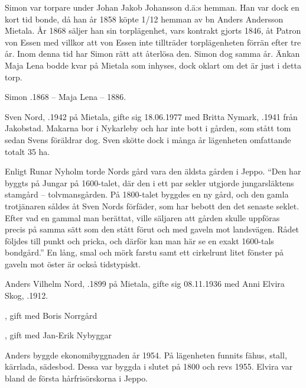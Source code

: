 Simon var torpare under Johan Jakob Johansson d.ä:s hemman. Han var dock en kort tid bonde, då han år 1858 köpte 1/12 hemman av bn Anders Andersson Mietala. År 1868 säljer han sin torplägenhet, vars kontrakt gjorts 1846, åt Patron von Essen med villkor att von Essen inte tillträder torplägenheten förrän efter tre år. Inom denna tid har Simon rätt att återlösa den. Simon dog samma år. Änkan Maja Lena bodde kvar på Mietala som inhyses, dock oklart om det är just i detta torp.

Simon .1868  --  Maja Lena  – 1886.






Sven Nord, .1942 på Mietala, gifte sig 18.06.1977 med Britta Nymark, .1941 från Jakobstad. Makarna bor i Nykarleby och har inte bott i gården, som stått tom sedan Svens föräldrar dog. Sven skötte dock i många år lägenheten omfattande totalt 35 ha.

Enligt Runar Nyholm torde Nords gård vara den äldsta gården i Jeppo. ``Den har byggts på Jungar på 1600-talet, där den i ett par sekler utgjorde jungarsläktens stamgård – tolvmansgården. På 1800-talet byggdes en ny gård, och den gamla trotjänaren såldes åt Sven Nords förfäder, som har bebott den det senaste seklet. Efter vad en gammal man berättat, ville säljaren att gården skulle uppföras precis på samma sätt som den stått förut och med gaveln mot landsvägen. Rådet följdes till punkt och pricka, och därför kan man här se en exakt 1600-tals bondgård.'' En lång, smal och mörk farstu samt ett cirkelrunt litet fönster på gaveln mot öster är också tidstypiskt.


Anders Vilhelm Nord, .1899 på Mietala, gifte sig 08.11.1936 med Anni Elvira Skog, .1912.
\begin{jhchildren}
  \item {}, gift med Boris Norrgård
  \item {}
  \item {}, gift med Jan-Erik Nybyggar
\end{jhchildren}

Anders byggde ekonomibyggnaden år 1954. På lägenheten funnits fähus, stall, kärrlada, sädesbod. Dessa var byggda i slutet på 1800 och revs 1955. Elvira var bland de första hårfrisörskorna i Jeppo.

